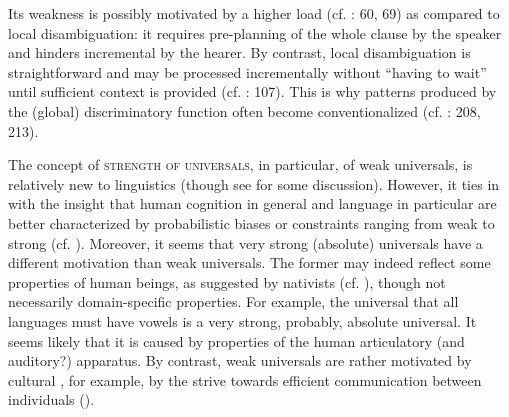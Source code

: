 \documentclass[output=paper]{langsci/langscibook}
\begin{document}
Its weakness is possibly motivated by a higher  load (cf. \citealt{Hawkins2014_CompMot}: 60, 69) as compared to local disambiguation: it requires pre-planning of the whole clause by the speaker and hinders incremental  by the hearer. By contrast, local disambiguation is straightforward and may be processed incrementally without “having to wait” until sufficient context is provided (cf. \citealt{Bornkessel-SchlesewskySchlesewsky2014}: 107). This is why patterns produced by the (global) discriminatory function often become conventionalized (cf. \citealt{Aissen2003,ZeevatJäger2002,Jäger2004,Malchukov2008}: 208, 213).

The concept of \textsc{strength of universals}, in particular, of weak universals, is relatively new to linguistics (though see \citealt{Bickel2013} for some discussion). However, it ties in with the insight that human cognition in general and language  in particular are better characterized by probabilistic biases or constraints ranging from weak to strong (cf. \citealt{ThompsonEtAl2016}). Moreover, it seems that very strong (absolute) universals have a different motivation than weak universals. The former may indeed reflect some  properties of human beings, as suggested by nativists (cf. \citealt{Chomsky1965}), though not necessarily domain-specific properties. For example, the universal that all languages must have vowels \citep[19]{Comrie1989} is a very strong, probably, absolute universal. It seems likely that it is caused by  properties of the human articulatory (and auditory?) apparatus. By contrast, weak universals are rather motivated by cultural , for example, by the strive towards efficient communication between individuals (). 
\newpage
\end{document}
